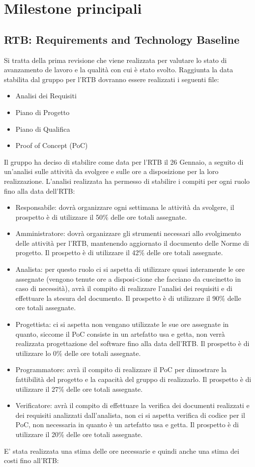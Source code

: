 \section{Milestone principali}
\label{sec:milestone_principali}
\subsection{RTB: Requirements and Technology Baseline}
Si tratta della prima revisione che viene realizzata per valutare lo stato di avanzamento de lavoro e la qualità con cui è stato svolto.
Raggiunta la data stabilita dal gruppo per l'RTB dovranno essere realizzati i seguenti file:

\begin{itemize}
\item Analisi dei Requisiti
\item Piano di Progetto
\item Piano di Qualifica
\item Proof of Concept (PoC)
\end{itemize}

Il gruppo ha deciso di stabilire come data per l'RTB il 26 Gennaio, a seguito di un'analisi sulle attività da svolgere e sulle ore a disposizione per la loro realizzazione.
L'analisi realizzata ha permesso di stabilire i compiti per ogni ruolo fino alla data dell'RTB:
\begin{itemize}
\item Responsabile: dovrà organizzare ogni settimana le attività da svolgere, il prospetto è di utilizzare il 50\% delle ore totali assegnate.
\item Amministratore: dovrà organizzare gli strumenti necessari allo svolgimento delle attività per l'RTB, mantenendo aggiornato il documento delle Norme di progetto.
Il prospetto è di utilizzare il 42\% delle ore totali assegnate.
\item Analista: per questo ruolo ci si aspetta di utilizzare quasi interamente le ore assegnate (vengono tenute ore a disposi<ione che facciano da cuscinetto in caso di necessità), avrà il compito di realizzare l'analisi dei requisiti e di effettuare la stesura del documento.
Il prospetto è di utilizzare il 90\% delle ore totali assegnate.
\item Progettista: ci si aspetta non vengano utilizzate le sue ore assegnate in quanto, siccome il PoC consiste in un artefatto usa e getta, non verrà realizzata progettazione del software fino alla data dell'RTB.
Il prospetto è di utilizzare lo 0\% delle ore totali assegnate.
\item Programmatore: avrà il compito di realizzare il PoC per dimostrare la fattibilità del progetto e la capacità del gruppo di realizzarlo.
Il prospetto è di utilizzare il 27\% delle ore totali assegnate.
\item Verificatore: avrà il compito di effettuare la verifica dei documenti realizzati e dei requisiti analizzati dall'analista, non ci si aspetta verifica di codice per il PoC, non necessaria in quanto è un artefatto usa e getta.
Il prospetto è di utilizzare il 20\% delle ore totali assegnate.
\end{itemize}
E' stata realizzata una stima delle ore necessarie e quindi anche una stima dei costi fino all'RTB:

